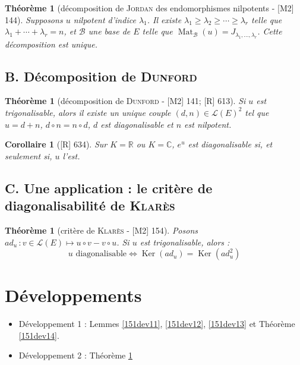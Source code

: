 \documentclass[10pt, a4paper, parskip=full, twoside, twocolumn]{report}
\newtheorem{theorem}[definition]{Théorème}
\newtheorem{corollary}[definition]{Corollaire}
\newcommand{\IC}{\mathbb{C}}
\newcommand{\IR}{\mathbb{R}}
\DeclareMathOperator{\Ker}{Ker}
\DeclareMathOperator{\Mat}{Mat}
\begin{document}
\begin{theorem}[décomposition de \textsc{Jordan} des endomorphismes nilpotents - \textnormal{[M2] 144}]
	Supposons $u$ nilpotent d'indice $\lambda_1$.
	Il existe $\lambda_1 \geq \lambda_2 \geq \cdots \geq \lambda_r$
	telle que $\lambda_1 + \cdots + \lambda_r = n$, et $\mathcal{B}$ une base de $E$ telle que $\Mat_{\mathcal{B}}(u) = J_{\lambda_1,\dots,\lambda_r}$.
	Cette décomposition est unique.
\end{theorem}

\subsection*{B. Décomposition de \textsc{Dunford}}

\begin{theorem}[décomposition de \textsc{Dunford} - \textnormal{[M2] 141; [R] 613}]
	Si $u$ est trigonalisable, alors il existe un unique couple $(d,n)\in\mathcal{L}(E)^2$ tel que $u = d+n$, $d\circ n = n\circ d$, $d$ est diagonalisable et $n$ est nilpotent.
\end{theorem}

\begin{corollary}[\textnormal{[R] 634}]
	Sur $K =\IR$ ou $K=\IC$, $e^u$ est diagonalisable si, et seulement si, $u$ l'est.
\end{corollary}

\subsection*{C. Une application : le critère de diagonalisabilité de \textsc{Klarès}}

\begin{tcolorbox}[
    breakable, %
    colback=developpement, %
    colframe=gray!0!black, %
    boxrule=0pt, %
    arc=1mm, %
	boxsep=0pt,
	left=0pt, right=0pt, top=0pt, bottom=0pt
]
\begin{theorem}[critère de \textsc{Klarès} - \textnormal{[M2] 154}]
	\label{151dev2}
	Posons $ad_u\,\colon v\in\mathcal{L}(E) \mapsto u\circ v - v\circ u$.
	Si $u$ est trigonalisable, alors :
	$$u \text{ diagonalisable} \iff \Ker(ad_u) = \Ker(ad_u^2)$$
\end{theorem}
\end{tcolorbox}

\section*{Développements}
\begin{itemize}
	\item Développement 1 : Lemmes \ref{151dev11}, \ref{151dev12}, \ref{151dev13} et Théorème \ref{151dev14}.
	\item Développement 2 : Théorème \ref{151dev2}
\end{itemize}
\end{document}
